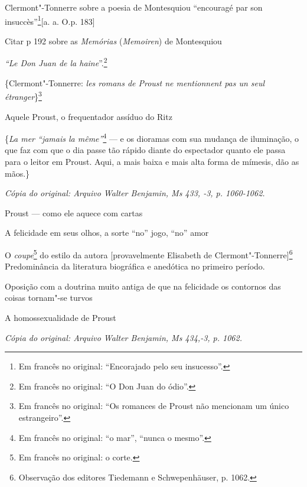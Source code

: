 Clermont"-Tonnerre sobre a poesia de Montesquiou ``encouragé par son
insuccès''\footnote{Em francês no original: ``Encorajado pelo seu insucesso''. \versal{[N. T.]}}{[}a. a. O.p. 183{]}

Citar p 192 sobre as \emph{Memórias} (\emph{Memoiren}) de Montesquiou

\emph{``Le Don Juan de la haine}''.\footnote{Em francês no original: ``O Don Juan do ódio''. \versal{[N. T.]}}

\{Clermont"-Tonnerre: \emph{les romans de Proust ne mentionnent pas un
seul étranger}\}\footnote{Em francês no original: ``Os romances
  de Proust não mencionam um único estrangeiro''. \versal{[N. T.]}}

Aquele Proust, o frequentador assíduo do Ritz

\{\emph{La mer ``jamais la même''}\footnote{Em francês no original: ``o mar'', ``nunca o mesmo''. \versal{[N. T.]}} --- e os dioramas com sua
mudança de iluminação, o que faz com que o dia passe tão rápido diante
do espectador quanto ele passa para o leitor em Proust. Aqui, a mais
baixa e mais alta forma de mímesis, dão as mãos.\}


\begin{flushright}
\emph{\small{Cópia do original: Arquivo Walter Benjamin, Ms 433, -3, p. 1060-1062.}}
\end{flushright}

Proust --- como ele aquece com cartas

A felicidade em seus olhos, a sorte ``no'' jogo, ``no'' amor

O \emph{coupe}\footnote{Em francês no original: o corte. \versal{[N. T.]}} do
estilo da autora {[}provavelmente Elisabeth de Clermont"-Tonnerre{]}\footnote{Observação dos editores Tiedemann e
  Schwepenhäuser, p. 1062. \versal{[N. E.]}} Predominância da literatura biográfica e
anedótica no primeiro período.

Oposição com a doutrina muito antiga de que na felicidade os contornos
das coisas tornam"-se turvos

A homossexualidade de Proust

\begin{flushright}
\emph{\small{Cópia do original: Arquivo Walter Benjamin, Ms 434,-3, p. 1062.}}
\end{flushright}

